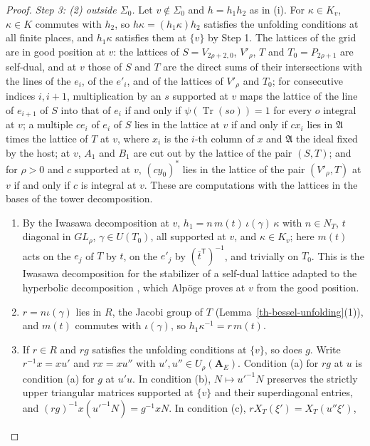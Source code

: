\begin{proof}
\emph{Step 3: (2) outside $\Sigma_0$.} Let $v\notin\Sigma_0$ and $h=h_1h_2$ as in
(i). For $\kappa\in K_v$, $\kappa\in K$ commutes with $h_2$, so
$h\kappa=(h_1\kappa)h_2$ satisfies the unfolding conditions at all finite places,
and $h_1\kappa$ satisfies them at $\{v\}$ by Step 1. The lattices of the grid are
in good position at $v$: the lattices of $S=V_{2\rho+2,0}$, $V'_\rho$, $T$ and
$T_0=P_{2\rho+1}$ are self-dual, and at $v$ those of $S$ and $T$ are the direct
sums of their intersections with the lines of the $e_i$, of the $e'_i$, and of
the lattices of $V'_\rho$ and $T_0$; for consecutive indices $i,i+1$,
multiplication by an $s$ supported at $v$ maps the lattice of the line of
$e_{i+1}$ of $S$ into that of $e_i$ if and only if $\psi(\operatorname{Tr}(so))=1$
for every $o$ integral at $v$; a multiple $ce_i$ of $e_i$ of $S$ lies in the
lattice at $v$ if and only if $cx_i$ lies in $\mathfrak A$ times the lattice of
$T$ at $v$, where $x_i$ is the $i$-th column of $x$ and $\mathfrak A$ the ideal
fixed by the host; at $v$, $A_1$ and $B_1$ are cut out by the lattice of the pair
$(S,T)$; and for $\rho>0$ and $c$ supported at $v$, $(cy_0)^*$ lies in the
lattice of the pair $(V'_\rho,T)$ at $v$ if and only if $c$ is integral at $v$.
These are computations with the lattices in the bases of the tower
decomposition.
\begin{enumerate}
\item[(a)] By the Iwasawa decomposition at $v$,
  $h_1=n\,m(t)\,\iota(\gamma)\,\kappa$ with $n\in N_T$, $t$ diagonal in
  $GL_\rho$, $\gamma\in U(T_0)$, all supported at $v$, and $\kappa\in K_v$; here
  $m(t)$ acts on the $e_j$ of $T$ by $t$, on the $e'_j$ by
  $(\bar t^{\mathsf T})^{-1}$, and trivially on $T_0$. This is the Iwasawa
  decomposition for the stabilizer of a self-dual lattice adapted to the
  hyperbolic decomposition \cite[\S3.5]{Car79}, which Alpöge proves at $v$ from
  the good position.
\item[(b)] $r=n\iota(\gamma)$ lies in $R$, the Jacobi group of $T$
  (Lemma~\ref{th-bessel-unfolding}(1)), and $m(t)$ commutes with $\iota(\gamma)$,
  so $h_1\kappa^{-1}=r\,m(t)$.
\item[(c)] If $r\in R$ and $rg$ satisfies the unfolding conditions at $\{v\}$, so
  does $g$. Write $r^{-1}x=xu'$ and $rx=xu''$ with $u',u''\in U_\rho(\mathbf A_E)$.
  Condition (a) for $rg$ at $u$ is condition (a) for $g$ at $u'u$. In condition
  (b), $N\mapsto u'^{-1}N$ preserves the strictly upper triangular matrices
  supported at $\{v\}$ and their superdiagonal entries, and
  $(rg)^{-1}x(u'^{-1}N)=g^{-1}xN$. In condition (c), $rX_T(\xi')=X_T(u''\xi')$,

\end{enumerate}
\end{proof}
